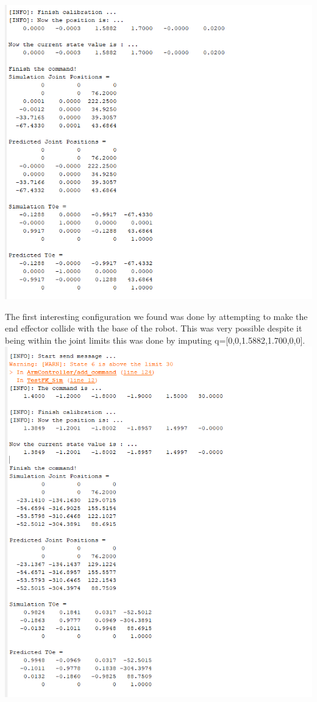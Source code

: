 \documentclass[12pt]{article}
\begin{document}
\includegraphics[scale=1]{firstweird config}
\par{
The first interesting configuration we found was done by attempting to make the end effector collide with the base of the robot. This was very possible despite it being within the joint limits this was done by imputing  q=[0,0,1.5882,1.700,0,0].  
}  
\includegraphics[scale=1]{entering the joint limits of every joint}
\end{document}
